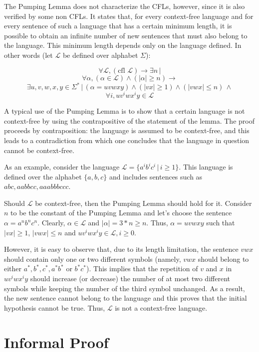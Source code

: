 \documentclass {elsarticle}
\begin{document}
The Pumping Lemma does not characterize the CFLs, however, since it is also verified by some non CFLs. It states that, for every context-free language and for every sentence of such a language that has a certain minimum length, it is possible to obtain an infinite number of new sentences that must also belong to the language. This minimum length depends only on the language defined. In other words (let $\mathcal {L}$ be defined over alphabet $\Sigma$):

$$\forall \mathcal {L}, (\mbox {cfl } \mathcal {L}) \rightarrow \exists n\, |$$
$$\forall \alpha, (\alpha \in \mathcal {L}) \land (|\alpha| \ge n )\rightarrow$$
$$\exists u, v, w, x, y \in \Sigma^*\, |\, (\alpha = uvwxy) \land (|vx| \ge 1) \land (|vwx| \le n)\,\land$$
$$\forall i, uv^iwx^iy \in \mathcal {L}$$

A typical use of the Pumping Lemma is to show that a certain language is not context-free by using the contrapositive of the statement of the lemma. The proof proceeds by contraposition: the language is assumed to be context-free, and this leads to a contradiction from which one concludes that the language in question cannot be context-free. 

As an example, consider the language $\mathcal {L} = \{a^ib^ic^i\,|\,i \ge 1\}$. This language is defined over the alphabet $\{a, b, c\}$ and includes sentences such as $abc, aabbcc, aaabbbccc$.

Should $\mathcal {L}$ be context-free, then the Pumping Lemma should hold for it. Consider $n$ to be the constant of the Pumping Lemma and let's choose the sentence $\alpha = a^nb^nc^n$. Clearly, $\alpha \in \mathcal {L}$ and $|\alpha| = 3*n \ge n$. Thus, $\alpha = uvwxy$ such that $|vx| \ge 1$, $|vwx| \le n$ and $uv^iwx^iy \in \mathcal {L}, i \ge 0$. 

However, it is easy to observe that, due to its length limitation, the sentence $vwx$ should contain only one or two different symbols (namely, $vwx$ should belong to either $a^*, b^*, c^*, a^*b^*$ or $b^*c^*$). This implies that the repetition of $v$ and $x$ in $uv^iwx^iy$ should increase (or decrease) the number of at most two different symbols while keeping the number of the third symbol unchanged. As a result, the new sentence cannot belong to the language and this proves that the initial hypothesis cannot be true. Thus, $\mathcal {L}$ is not a context-free language.

\section {Informal Proof}
\label {sec-informal}
\end{document}
